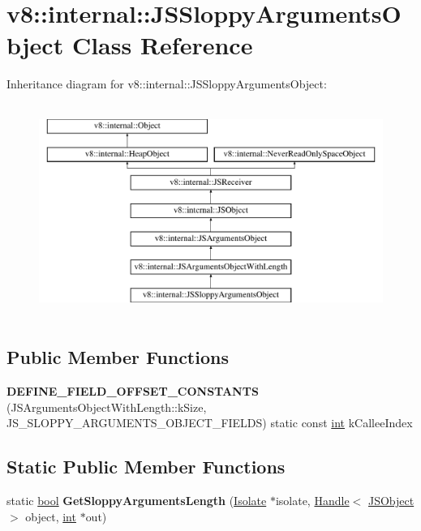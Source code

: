 \hypertarget{classv8_1_1internal_1_1JSSloppyArgumentsObject}{}\section{v8\+:\+:internal\+:\+:J\+S\+Sloppy\+Arguments\+Object Class Reference}
\label{classv8_1_1internal_1_1JSSloppyArgumentsObject}
Inheritance diagram for v8\+:\+:internal\+:\+:J\+S\+Sloppy\+Arguments\+Object\+:\begin{figure}[H]
\begin{center}
\leavevmode
\includegraphics[height=7.000000cm]{classv8_1_1internal_1_1JSSloppyArgumentsObject}
\end{center}
\end{figure}
\subsection*{Public Member Functions}
\begin{DoxyCompactItemize}
\item 
\mbox{\label{classv8_1_1internal_1_1JSSloppyArgumentsObject_a71ea6fd3d37fb2b3c716710428fa3d72}} 
{\bfseries D\+E\+F\+I\+N\+E\+\_\+\+F\+I\+E\+L\+D\+\_\+\+O\+F\+F\+S\+E\+T\+\_\+\+C\+O\+N\+S\+T\+A\+N\+TS} (J\+S\+Arguments\+Object\+With\+Length\+::k\+Size, J\+S\+\_\+\+S\+L\+O\+P\+P\+Y\+\_\+\+A\+R\+G\+U\+M\+E\+N\+T\+S\+\_\+\+O\+B\+J\+E\+C\+T\+\_\+\+F\+I\+E\+L\+DS) static const \mbox{\hyperlink{classint}{int}} k\+Callee\+Index
\end{DoxyCompactItemize}
\subsection*{Static Public Member Functions}
\begin{DoxyCompactItemize}
\item 
\mbox{\label{classv8_1_1internal_1_1JSSloppyArgumentsObject_a953d45c477dc6f8c9bea73c63fc4c3af}} 
static \mbox{\hyperlink{classbool}{bool}} {\bfseries Get\+Sloppy\+Arguments\+Length} (\mbox{\hyperlink{classv8_1_1internal_1_1Isolate}{Isolate}} $\ast$isolate, \mbox{\hyperlink{classv8_1_1internal_1_1Handle}{Handle}}$<$ \mbox{\hyperlink{classv8_1_1internal_1_1JSObject}{J\+S\+Object}} $>$ object, \mbox{\hyperlink{classint}{int}} $\ast$out)
\end{DoxyCompactItemize}

